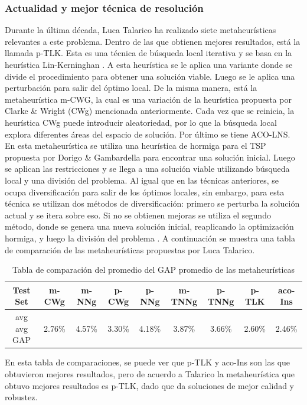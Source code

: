 \documentclass{article}
\begin{document}
\subsubsection{Actualidad y mejor técnica de resolución}
Durante la última década, Luca Talarico ha realizado siete metaheurísticas relevantes a este problema. Dentro de las que obtienen mejores resultados, está la llamada p-TLK. Esta es una técnica de búsqueda local iterativa \cite{lourencco2019iterated} y se basa en la heurística Lin-Kerninghan \cite{helsgaun2000effective}. A esta heurística se le aplica una variante donde se divide el procedimiento para obtener una solución viable. Luego se le aplica una perturbación para salir del óptimo local. De la misma manera, está la metaheurística m-CWG, la cual es una variación de la heurística propuesta por Clarke \& Wright (CWg) mencionada anteriormente. Cada vez que se reinicia, la heurística CWg puede introducir aleatoriedad, por lo que la búsqueda local explora diferentes áreas del espacio de solución. Por último se tiene ACO-LNS. En esta metaheurística se utiliza una heurística de hormiga para el TSP propuesta por Dorigo \& Gambardella para encontrar una solución inicial. Luego se aplican las restricciones y se llega a una solución viable utilizando búsqueda local y una división del problema. Al igual que en las técnicas anteriores, se ocupa diversificación para salir de los óptimos locales, sin embargo, para esta técnica se utilizan dos métodos de diversificación: primero se perturba la solución actual y se itera sobre eso. Si no se obtienen mejoras se utiliza el segundo método, donde se genera una nueva solución inicial, reaplicando la optimización hormiga, y luego la división del problema \cite{talarico2017large}. A continuación se muestra una tabla de comparación de las metaheurísticas propuestas por Luca Talarico. 


\begin{table}[H]
    \begin{tabular}{|c|c|c|c|c|c|c|c|c|}
    \hline
    Test Set    & m-CWg  & m-NNg  & p-CWg  & p-NNg  & m-TNNg & p-TNNg & p-TLK  & aco-Ins \\ \hline
    avg avg GAP & 2.76\% & 4.57\% & 3.30\% & 4.18\% & 3.87\% & 3.66\% & 2.60\% & 2.46\%  \\ \hline
    \end{tabular}
    \caption{Tabla de comparación del promedio del GAP promedio de las metaheurísticas \cite{talarico2017large}}
    \label{fig:metaheuristic-comparison}
\end{table}
En esta tabla de comparaciones, se puede ver que p-TLK y aco-Ins son las que obtuvieron mejores resultados, pero de acuerdo a Talarico \cite{talarico2015metaheuristics} la metaheurística que obtuvo mejores resultados es p-TLK, dado que da soluciones de mejor calidad y robustez.
\end{document}
